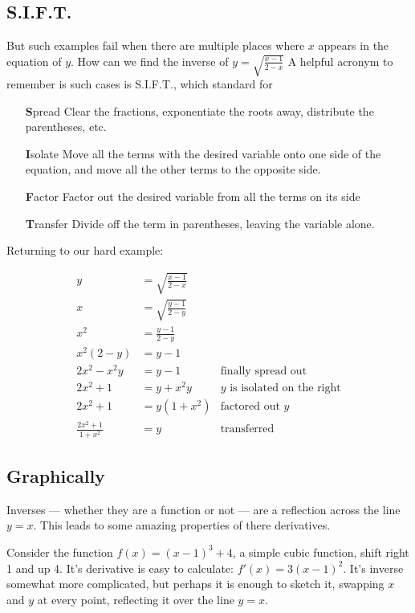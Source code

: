 \subsection{S.I.F.T.}
But such examples fail when there are multiple places where $x$ appears in the equation
of $y$.  How can we find the inverse of $y=\sqrt{\frac{x-1}{2-x}}$  A helpful acronym to 
remember is such cases is S.I.F.T., which standard for
\begin{itemize}
\item[\textbf{S}pread] Clear the fractions, exponentiate the roots away, distribute the parentheses, etc.
\item[\textbf{I}solate] Move all the terms with the desired variable onto one side of the equation, and move all the other terms to the opposite side.
\item[\textbf{F}actor] Factor out the desired variable from all the terms on its side
\item[\textbf{T}ransfer] Divide off the term in parentheses, leaving the variable alone.
\end{itemize}
Returning to our hard example:

\begin{align*}
	y  &= \sqrt{\frac{x-1}{2-x}}\\
	x  &= \sqrt{\frac{y-1}{2-y}}\\
	x^2 &= \frac{y-1}{2-y}\\
	x^2(2-y) &= y-1 \\
	2x^2-x^2y &= y-1 &\text{finally spread out}\\
	2x^2 + 1 &= y + x^2y & \text{$y$ is isolated on the right}\\
	2x^2 + 1 &= y(1+x^2) & \text{factored out $y$}\\
	\frac{2x^2+1}{1+x^2} &= y & \text{transferred}
\end{align*}


\subsection{Graphically}
Inverses --- whether they are a function or not --- are a reflection across the line $y=x$.
This leads to some amazing properties of there derivatives.

Consider the function $f(x) = (x-1)^3+4$, a simple cubic function, shift right 1 and up 4.
It's derivative is easy to calculate: $f'(x)=3(x-1)^2$.  It's inverse somewhat more complicated,
but perhaps it is enough to sketch it, swapping $x$ and $y$ at every point, reflecting it over
the line $y=x$.

